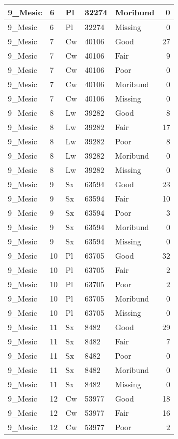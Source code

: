 \documentclass[
]{article}
\begin{document}
\begin{tabular}{l|l|l|l|l|r}
\hline
9\_Mesic & 6 & Pl & 32274 & Moribund & 0\\
\hline
9\_Mesic & 6 & Pl & 32274 & Missing & 0\\
\hline
9\_Mesic & 7 & Cw & 40106 & Good & 27\\
\hline
9\_Mesic & 7 & Cw & 40106 & Fair & 9\\
\hline
9\_Mesic & 7 & Cw & 40106 & Poor & 0\\
\hline
9\_Mesic & 7 & Cw & 40106 & Moribund & 0\\
\hline
9\_Mesic & 7 & Cw & 40106 & Missing & 0\\
\hline
9\_Mesic & 8 & Lw & 39282 & Good & 8\\
\hline
9\_Mesic & 8 & Lw & 39282 & Fair & 17\\
\hline
9\_Mesic & 8 & Lw & 39282 & Poor & 8\\
\hline
9\_Mesic & 8 & Lw & 39282 & Moribund & 0\\
\hline
9\_Mesic & 8 & Lw & 39282 & Missing & 0\\
\hline
9\_Mesic & 9 & Sx & 63594 & Good & 23\\
\hline
9\_Mesic & 9 & Sx & 63594 & Fair & 10\\
\hline
9\_Mesic & 9 & Sx & 63594 & Poor & 3\\
\hline
9\_Mesic & 9 & Sx & 63594 & Moribund & 0\\
\hline
9\_Mesic & 9 & Sx & 63594 & Missing & 0\\
\hline
9\_Mesic & 10 & Pl & 63705 & Good & 32\\
\hline
9\_Mesic & 10 & Pl & 63705 & Fair & 2\\
\hline
9\_Mesic & 10 & Pl & 63705 & Poor & 2\\
\hline
9\_Mesic & 10 & Pl & 63705 & Moribund & 0\\
\hline
9\_Mesic & 10 & Pl & 63705 & Missing & 0\\
\hline
9\_Mesic & 11 & Sx & 8482 & Good & 29\\
\hline
9\_Mesic & 11 & Sx & 8482 & Fair & 7\\
\hline
9\_Mesic & 11 & Sx & 8482 & Poor & 0\\
\hline
9\_Mesic & 11 & Sx & 8482 & Moribund & 0\\
\hline
9\_Mesic & 11 & Sx & 8482 & Missing & 0\\
\hline
9\_Mesic & 12 & Cw & 53977 & Good & 18\\
\hline
9\_Mesic & 12 & Cw & 53977 & Fair & 16\\
\hline
9\_Mesic & 12 & Cw & 53977 & Poor & 2\\

\end{tabular}
\end{document}
